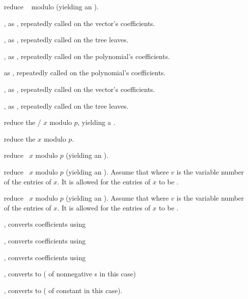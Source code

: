  reduce ~ modulo 
(yielding an ).

, as , repeatedly
called on the vector's coefficients.

, as , repeatedly
called on the tree leaves.

, as ,
repeatedly called on the polynomial's coefficients.

 as ,
repeatedly called on the polynomial's coefficients.

, as ,
repeatedly called on the vector's coefficients.

, as ,
repeatedly called on the tree leaves.

 reduce the /
$x$ modulo $p$, yielding a .

 reduce the  $x$ modulo $p$.

 reduce ~$x$ modulo $p$
(yielding an ).

 reduce ~$x$ modulo $p$
(yielding an ). Assume that  where $v$ is
the variable number of the entries of $x$. It is allowed for the entries of
$x$ to be .

 reduce ~$x$ modulo $p$
(yielding an ). Assume that  where $v$ is
the variable number of the entries of $x$. It is allowed for the entries of $x$
to be .

, converts coefficients using 

, converts coefficients using 

, converts coefficients using 


, converts to  ( of nonnegative
s in this case)

, converts to  ( of constant
 in this case).

